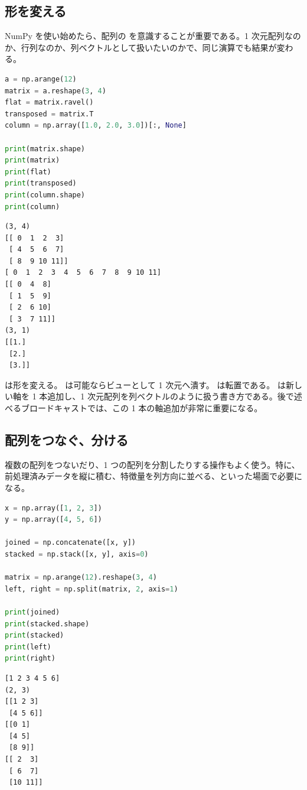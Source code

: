 \subsection{形を変える}

NumPy を使い始めたら、配列の  を意識することが重要である。1 次元配列なのか、行列なのか、列ベクトルとして扱いたいのかで、同じ演算でも結果が変わる。

\begin{lstlisting}[language=Python]
a = np.arange(12)
matrix = a.reshape(3, 4)
flat = matrix.ravel()
transposed = matrix.T
column = np.array([1.0, 2.0, 3.0])[:, None]

print(matrix.shape)
print(matrix)
print(flat)
print(transposed)
print(column.shape)
print(column)
\end{lstlisting}

\begin{lstlisting}[numbers=none, xleftmargin=2\zw]
(3, 4)
[[ 0  1  2  3]
 [ 4  5  6  7]
 [ 8  9 10 11]]
[ 0  1  2  3  4  5  6  7  8  9 10 11]
[[ 0  4  8]
 [ 1  5  9]
 [ 2  6 10]
 [ 3  7 11]]
(3, 1)
[[1.]
 [2.]
 [3.]]
\end{lstlisting}

 は形を変える。 は可能ならビューとして 1 次元へ潰す。 は転置である。\code{[:, None]} は新しい軸を 1 本追加し、1 次元配列を列ベクトルのように扱う書き方である。後で述べるブロードキャストでは、この 1 本の軸追加が非常に重要になる。

\subsection{配列をつなぐ、分ける}

複数の配列をつないだり、1 つの配列を分割したりする操作もよく使う。特に、前処理済みデータを縦に積む、特徴量を列方向に並べる、といった場面で必要になる。

\begin{lstlisting}[language=Python]
x = np.array([1, 2, 3])
y = np.array([4, 5, 6])

joined = np.concatenate([x, y])
stacked = np.stack([x, y], axis=0)

matrix = np.arange(12).reshape(3, 4)
left, right = np.split(matrix, 2, axis=1)

print(joined)
print(stacked.shape)
print(stacked)
print(left)
print(right)
\end{lstlisting}

\begin{lstlisting}[numbers=none, xleftmargin=2\zw]
[1 2 3 4 5 6]
(2, 3)
[[1 2 3]
 [4 5 6]]
[[0 1]
 [4 5]
 [8 9]]
[[ 2  3]
 [ 6  7]
 [10 11]]
\end{lstlisting}

